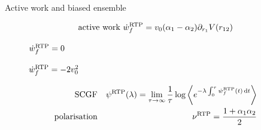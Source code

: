\documentclass{beamer}
\begin{document}
\begin{frame}{Active work and biased ensemble}

\vspace{-25pt}
\begin{equation}
\text{active work}~ \dot{w}^{\rm RTP}_f = v_0(\alpha_1 - \alpha_2) \partial_{r_1} V(r_{12})
\end{equation}

\return
\begin{figure}
\centering
\begin{minipage}{0.48\textwidth}
\centering

$\dot{w}^{\rm RTP}_f = 0$
\end{minipage}
\hfill
\begin{minipage}{0.48\textwidth}
\centering

$\dot{w}^{\rm RTP}_f = -2 v_0^2$
\end{minipage}
\end{figure}

\return
\begin{eqnarray}
\text{SCGF}& &\psi^{\rm RTP}(\lambda) = \lim_{\tau \to \infty} \frac{1}{\tau} \log\left<e^{-\lambda \int_0^\tau \dot{w}^{\rm RTP}_f(t) \, \mathrm{d}t}\right>\\
\text{polarisation}& &\nu^{\rm RTP} = \frac{1 + \alpha_1\alpha_2}{2}
\end{eqnarray}

\end{frame}
\end{document}
